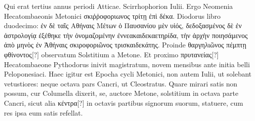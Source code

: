 Qui erat
tertius annus periodi Atticae.
Scirrhophorion  Iulii.
Ergo Neomenia
Hecatombaeonis Metonici \textgreek{σκιῤῥοφοριωνος τρίτῃ ἐπὶ δέκα}.
Diodorus
libro duodecimo:
 \textgreek{ἐν δὲ ταῖς Αθήναις Μέτων ὁ Παυσανίου μὲν υἱός,
δεδοξασμένος δὲ ἐν ἀστρολογίᾳ ἐξέθηκε τὴν ὀνομαζομένην ἐννεακαιδεκαετηρίδα,
τὴν ἀρχὴν ποιησάμενος ἀπὸ μηνὸς ἐν Ἀθήναις σκιροφοριῶνος τρισκαιδεκάτης.}
Proinde \textgreek{θαργηλιῶνος πέμπτῃ φθίνοντος[?]}
 observatum Solstitium
a Metone.
Et proximo \textgreek{πρυτανείας[?]} Hecatombaeone Pythodorus
inivit magistratum, novem mensibus ante initia belli Peloponesiaci.
Haec igitur est Epocha cycli Metonici, non autem  Iulii,
ut solebant vetustiores: neque octava pars Cancri, ut Cleostratus.
Quare mirari satis non possum, cur Columella dixerit, se, auctore
Metone, solstitium in octava parte Cancri, sicut alia \textgreek{κέντρα[?]}
in octavis partibus signorum suorum, statuere, cum res ipsa eum
satis refellat.

